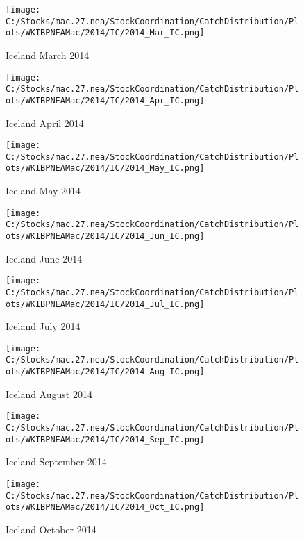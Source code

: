 \documentclass{article}
\begin{document}
\begin{figure}
	\centering
		\texttt{[image: C:/Stocks/mac.27.nea/StockCoordination/CatchDistribution/Plots/WKIBPNEAMac/2014/IC/2014\_Mar\_IC.png]}
	\caption{Iceland March 2014}
	\label{fig:2014_Mar_IC}
\end{figure}

\begin{figure}
	\centering
		\texttt{[image: C:/Stocks/mac.27.nea/StockCoordination/CatchDistribution/Plots/WKIBPNEAMac/2014/IC/2014\_Apr\_IC.png]}
	\caption{Iceland April 2014}
	\label{fig:2014_Apr_IC}
\end{figure}

\begin{figure}
	\centering
		\texttt{[image: C:/Stocks/mac.27.nea/StockCoordination/CatchDistribution/Plots/WKIBPNEAMac/2014/IC/2014\_May\_IC.png]}
	\caption{Iceland May 2014}
	\label{fig:2014_May_IC}
\end{figure}

\begin{figure}
	\centering
		\texttt{[image: C:/Stocks/mac.27.nea/StockCoordination/CatchDistribution/Plots/WKIBPNEAMac/2014/IC/2014\_Jun\_IC.png]}
	\caption{Iceland June 2014}
	\label{fig:2014_Jun_IC}
\end{figure}

\begin{figure}
	\centering
		\texttt{[image: C:/Stocks/mac.27.nea/StockCoordination/CatchDistribution/Plots/WKIBPNEAMac/2014/IC/2014\_Jul\_IC.png]}
	\caption{Iceland July 2014}
	\label{fig:2014_Jul_IC}
\end{figure}

\begin{figure}
	\centering
		\texttt{[image: C:/Stocks/mac.27.nea/StockCoordination/CatchDistribution/Plots/WKIBPNEAMac/2014/IC/2014\_Aug\_IC.png]}
	\caption{Iceland August 2014}
	\label{fig:2014_Aug_IC}
\end{figure}

\begin{figure}
	\centering
		\texttt{[image: C:/Stocks/mac.27.nea/StockCoordination/CatchDistribution/Plots/WKIBPNEAMac/2014/IC/2014\_Sep\_IC.png]}
	\caption{Iceland September 2014}
	\label{fig:2014_Sep_IC}
\end{figure}

\begin{figure}
	\centering
		\texttt{[image: C:/Stocks/mac.27.nea/StockCoordination/CatchDistribution/Plots/WKIBPNEAMac/2014/IC/2014\_Oct\_IC.png]}
	\caption{Iceland October 2014}
	\label{fig:2014_Oct_IC}
\end{figure}
\end{document}
